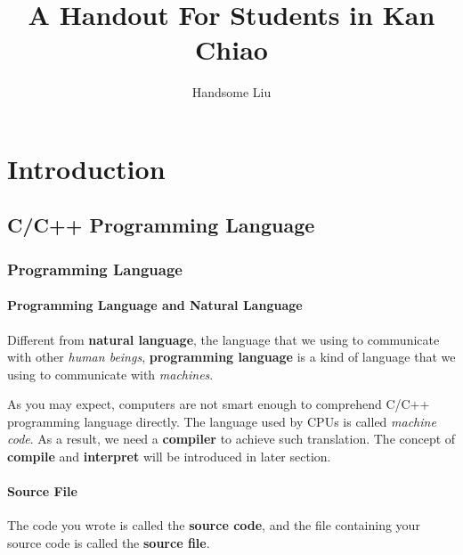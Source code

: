 \documentclass{report}
\title{A Handout For Students in Kan Chiao}
\author{Handsome Liu}
\begin{document}
\fontsize{12pt}{16pt}\selectfont
\maketitle
\tableofcontents
\part{Introduction}
\chapter{C/C++ Programming Language}
\section{Programming Language}
\subsection{Programming Language and Natural Language}

    Different from \textbf{natural language}, the language that we using to communicate with other \textit{human beings}, \textbf{programming language} is a kind of language that we using to communicate with \textit{machines}.

    As you may expect, computers are not smart enough to comprehend C/C++ programming language directly. The language used by CPUs is called \textit{machine code}. As a result, we need a \textbf{compiler} to achieve such translation. The concept of \textbf{compile} and \textbf{interpret} will be introduced in later section.\\

    \begin{framed}
    \begin{center}
    \end{center}
    \end{framed}
    
\subsection{Source File}
    The code you wrote is called the \textbf{source code}, and the file containing your source code is called the \textbf{source file}.
\end{document}
